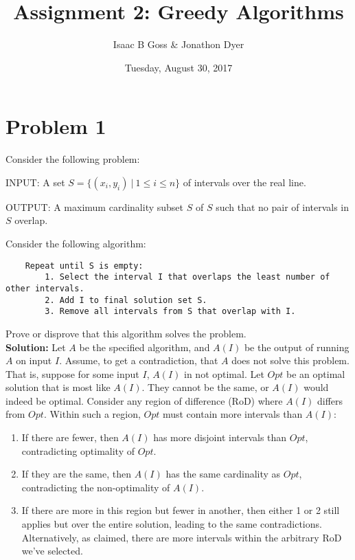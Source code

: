 \documentclass{article}
\author{Isaac B Goss \& Jonathon Dyer}
\title{Assignment 2: Greedy Algorithms}
\date{Tuesday, August 30, 2017}
\providecommand{\soln}{\textbf{Solution: }}
\begin{document}
\maketitle

    \section*{Problem 1}
    Consider the following problem:
    
    INPUT: A set $S = \{(x_i, y_i)\ |\ 1 \leq i \leq n\}$ of intervals over the real line.
    
    OUTPUT: A maximum cardinality subset $S$ of $S$ such that no pair of intervals in $S$ overlap.
        
    Consider the following algorithm:
    
    \begin{lstlisting}
    Repeat until S is empty:
        1. Select the interval I that overlaps the least number of other intervals.
        2. Add I to final solution set S.
        3. Remove all intervals from S that overlap with I.
    \end{lstlisting}

    Prove or disprove that this algorithm solves the problem.\\
    
    \soln Let $A$ be the specified algorithm, and $A(I)$ be the output of running $A$ on input $I$.
    Assume, to get a contradiction, that $A$ does not solve this problem.
    That is, suppose for some input $I$, $A(I)$ in not optimal.
    Let $Opt$ be an optimal solution that is most like $A(I)$.
    They cannot be the same, or $A(I)$ would indeed be optimal.
    Consider any region of difference (RoD) where $A(I)$ differs from $Opt$.
    Within such a region, $Opt$ must contain more intervals than $A(I)$:
    
    \begin{enumerate}
        \item If there are fewer, then $A(I)$ has more disjoint intervals than $Opt$, contradicting optimality of $Opt$.
        \item If they are the same, then $A(I)$ has the same cardinality as $Opt$, contradicting the non-optimality of $A(I)$.
        \item If there are more in this region but fewer in another, then either 1 or 2 still applies but over the entire solution, leading to the same contradictions. Alternatively, as claimed, there are more intervals within the arbitrary RoD we've selected.
    \end{enumerate}
    
\end{document}
